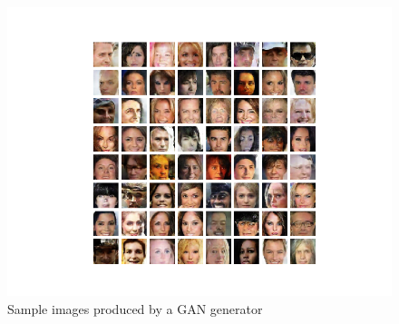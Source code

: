 \begin{figure}[h]
	\includegraphics[scale=1.0]{figures/gan_palette}
	\caption{Sample images produced by a GAN generator}
\end{figure}